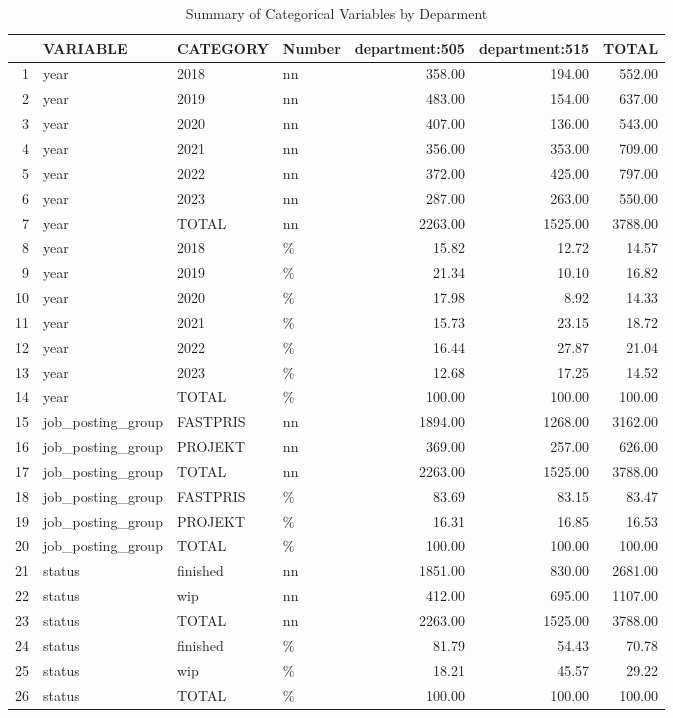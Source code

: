 \begin{sidewaystable}[ht]
\centering
\caption{Summary of Categorical Variables by Deparment} 
\begin{tabular}{rlllrrr}
  \hline
 & VARIABLE & CATEGORY & Number & department:505 & department:515 & TOTAL \\ 
  \hline
1 & year & 2018 & nn & 358.00 & 194.00 & 552.00 \\ 
  2 & year & 2019 & nn & 483.00 & 154.00 & 637.00 \\ 
  3 & year & 2020 & nn & 407.00 & 136.00 & 543.00 \\ 
  4 & year & 2021 & nn & 356.00 & 353.00 & 709.00 \\ 
  5 & year & 2022 & nn & 372.00 & 425.00 & 797.00 \\ 
  6 & year & 2023 & nn & 287.00 & 263.00 & 550.00 \\ 
  7 & year & TOTAL & nn & 2263.00 & 1525.00 & 3788.00 \\ 
  8 & year & 2018 & \% & 15.82 & 12.72 & 14.57 \\ 
  9 & year & 2019 & \% & 21.34 & 10.10 & 16.82 \\ 
  10 & year & 2020 & \% & 17.98 & 8.92 & 14.33 \\ 
  11 & year & 2021 & \% & 15.73 & 23.15 & 18.72 \\ 
  12 & year & 2022 & \% & 16.44 & 27.87 & 21.04 \\ 
  13 & year & 2023 & \% & 12.68 & 17.25 & 14.52 \\ 
  14 & year & TOTAL & \% & 100.00 & 100.00 & 100.00 \\ 
  15 & job\_posting\_group & FASTPRIS & nn & 1894.00 & 1268.00 & 3162.00 \\ 
  16 & job\_posting\_group & PROJEKT & nn & 369.00 & 257.00 & 626.00 \\ 
  17 & job\_posting\_group & TOTAL & nn & 2263.00 & 1525.00 & 3788.00 \\ 
  18 & job\_posting\_group & FASTPRIS & \% & 83.69 & 83.15 & 83.47 \\ 
  19 & job\_posting\_group & PROJEKT & \% & 16.31 & 16.85 & 16.53 \\ 
  20 & job\_posting\_group & TOTAL & \% & 100.00 & 100.00 & 100.00 \\ 
  21 & status & finished & nn & 1851.00 & 830.00 & 2681.00 \\ 
  22 & status & wip & nn & 412.00 & 695.00 & 1107.00 \\ 
  23 & status & TOTAL & nn & 2263.00 & 1525.00 & 3788.00 \\ 
  24 & status & finished & \% & 81.79 & 54.43 & 70.78 \\ 
  25 & status & wip & \% & 18.21 & 45.57 & 29.22 \\ 
  26 & status & TOTAL & \% & 100.00 & 100.00 & 100.00 \\ 
   \hline
\end{tabular}
\end{sidewaystable}
